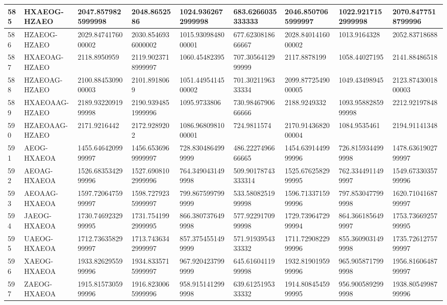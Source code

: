 {\begin{longtable}{|l|l|l|l|l|l|l|l|l|}
        585 & HXAEOG-HZAEO & 2047.8579825999998 & 2048.8652586 & 1024.9362672999998 & 683.6266035333333 & 2046.8507065999997 & 1022.9217152999998 & 2070.8477518799996 \\ \hline
        586 & HZAEOG-HZAEO & 2029.8474176000002 & 2030.8546936000002 & 1015.9309848000001 & 677.6230818666667 & 2028.8401416000002 & 1013.9164328 & 2052.83718688 \\ \hline
        587 & HXAEOAG-HZAEO & 2118.8950959 & 2119.9023718999997 & 1060.45482395 & 707.3056412999999 & 2117.8878199 & 1058.44027195 & 2141.88486518 \\ \hline
        588 & HZAEOAG-HZAEO & 2100.8845309000003 & 2101.8918069 & 1051.4495414500002 & 701.3021196333334 & 2099.8772549000005 & 1049.43498945 & 2123.8743001800003 \\ \hline
        589 & HXAEOAAG-HZAEO & 2189.9322091999998 & 2190.9394851999996 & 1095.9733806 & 730.9846790666666 & 2188.9249332 & 1093.9588285999998 & 2212.92197848 \\ \hline
        590 & HZAEOAAG-HZAEO & 2171.9216442 & 2172.9289202 & 1086.9680981000001 & 724.9811574 & 2170.9143682000004 & 1084.9535461 & 2194.91141348 \\ \hline
        591 & AEOG-HXAEOA & 1455.6464209999997 & 1456.6536969999997 & 728.8304864999999 & 486.2227496666665 & 1454.6391449999996 & 726.8159344999998 & 1478.6361902799997 \\ \hline
        592 & AEOAG-HXAEOA & 1526.6835342999996 & 1527.6908102999996 & 764.3490431499998 & 509.90178743333314 & 1525.6762582999995 & 762.3344911499997 & 1549.6733035799996 \\ \hline
        593 & AEOAAG-HXAEOA & 1597.7206475999997 & 1598.7279235999997 & 799.8675997999999 & 533.5808251999998 & 1596.7133715999996 & 797.8530477999998 & 1620.7104168799997 \\ \hline
        594 & JAEOG-HXAEOA & 1730.7469232999995 & 1731.7541992999995 & 866.3807376499998 & 577.9229170999998 & 1729.7396472999994 & 864.3661856499997 & 1753.7366925799995 \\ \hline
        595 & UAEOG-HXAEOA & 1712.7363582999997 & 1713.7436342999997 & 857.3754551499999 & 571.9193954333332 & 1711.7290822999996 & 855.3609031499998 & 1735.7261275799997 \\ \hline
        596 & XAEOG-HXAEOA & 1933.8262955999996 & 1934.8335715999997 & 967.9204237999999 & 645.6160411999998 & 1932.8190195999996 & 965.9058717999998 & 1956.8160648799997 \\ \hline
        597 & ZAEOG-HXAEOA & 1915.8157305999996 & 1916.8230065999996 & 958.9151412999998 & 639.6125195333332 & 1914.8084545999995 & 956.9005892999998 & 1938.8054998799996 \\ \hline

\end{longtable}}
